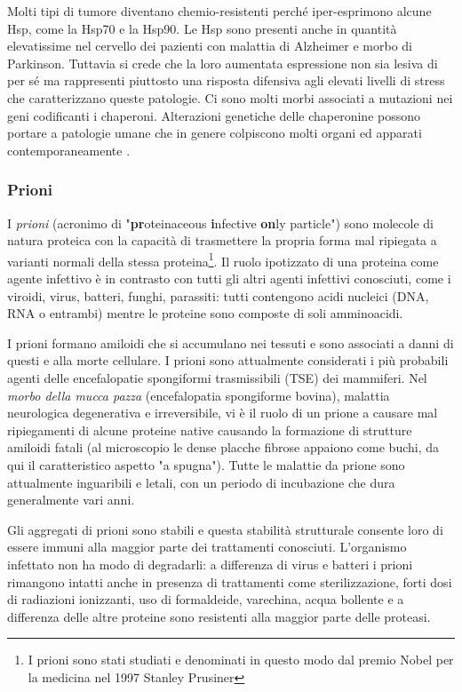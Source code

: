 {{Molti tipi di tumore diventano chemio-resistenti perché iper-esprimono alcune Hsp, come la Hsp70 e la Hsp90. Le Hsp sono presenti anche in quantità elevatissime nel cervello dei pazienti con malattia di Alzheimer e morbo di Parkinson. Tuttavia si crede che la loro aumentata espressione non sia lesiva di per sé ma rappresenti piuttosto una risposta difensiva agli elevati livelli di stress che caratterizzano queste patologie. Ci sono molti morbi associati a mutazioni nei geni codificanti i chaperoni. Alterazioni genetiche delle chaperonine possono portare a patologie umane che in genere colpiscono molti organi ed apparati contemporaneamente \supercite{chaperoninaWiki}. \\


\subsubsection{Prioni}
\par I \textit{prioni} (acronimo di "\textbf{pr}oteinaceous \textbf{i}nfective \textbf{on}ly particle") sono molecole di natura proteica con la capacità di trasmettere la propria forma mal ripiegata a varianti normali della stessa proteina\footnote{I prioni sono stati studiati e denominati in questo modo dal premio Nobel per la medicina nel 1997 Stanley Prusiner\supercite{prusiner1998prion}}. Il ruolo ipotizzato di una proteina come agente infettivo è in contrasto con tutti gli altri agenti infettivi conosciuti, come i viroidi, virus, batteri, funghi, parassiti: tutti contengono acidi nucleici (DNA, RNA o entrambi) mentre le proteine sono composte di soli amminoacidi.

\par I prioni formano amiloidi che si accumulano nei tessuti e sono associati a danni di questi e alla morte cellulare. I prioni sono attualmente considerati i più probabili agenti delle encefalopatie spongiformi trasmissibili (TSE) dei mammiferi. Nel \textit{morbo della mucca pazza} (encefalopatia spongiforme bovina), malattia neurologica degenerativa e irreversibile, vi è il ruolo di un prione a causare mal ripiegamenti di alcune proteine native causando la formazione di strutture amiloidi fatali (al microscopio le dense placche fibrose appaiono come buchi, da qui il caratteristico aspetto "a spugna"). Tutte le malattie da prione sono attualmente inguaribili e letali, con un periodo di incubazione che dura generalmente vari anni.

\par Gli aggregati di prioni sono stabili e questa stabilità strutturale consente loro di essere immuni alla maggior parte dei trattamenti conosciuti. L'organismo infettato non ha modo di degradarli: a differenza di virus e batteri i prioni rimangono intatti anche in presenza di trattamenti come sterilizzazione, forti dosi di radiazioni ionizzanti, uso di formaldeide, varechina, acqua bollente e a differenza delle altre proteine sono resistenti alla maggior parte delle proteasi.

}}

